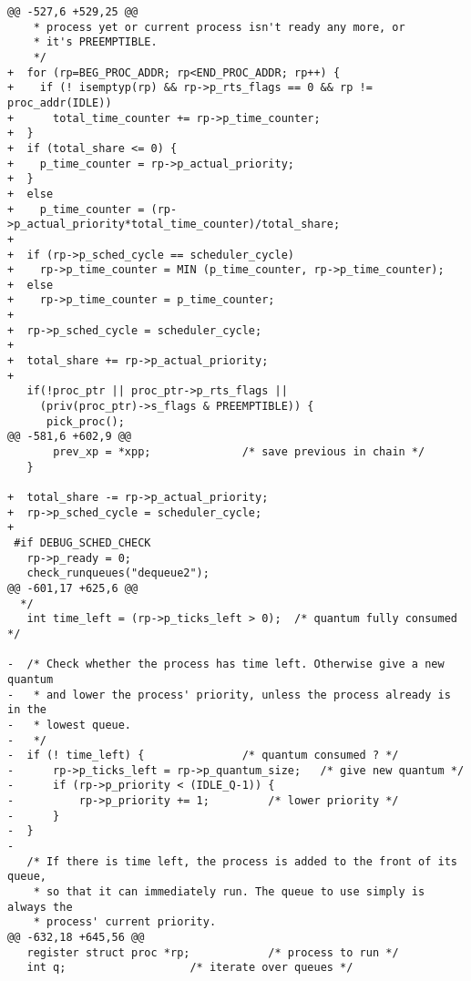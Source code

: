 \begin{verbatim}
@@ -527,6 +529,25 @@
    * process yet or current process isn't ready any more, or
    * it's PREEMPTIBLE.
    */
+  for (rp=BEG_PROC_ADDR; rp<END_PROC_ADDR; rp++) {
+    if (! isemptyp(rp) && rp->p_rts_flags == 0 && rp != proc_addr(IDLE))
+      total_time_counter += rp->p_time_counter;
+  }
+  if (total_share <= 0) {
+    p_time_counter = rp->p_actual_priority;
+  }
+  else
+    p_time_counter = (rp->p_actual_priority*total_time_counter)/total_share; 
+
+  if (rp->p_sched_cycle == scheduler_cycle)
+    rp->p_time_counter = MIN (p_time_counter, rp->p_time_counter);
+  else
+    rp->p_time_counter = p_time_counter;
+
+  rp->p_sched_cycle = scheduler_cycle;
+
+  total_share += rp->p_actual_priority;
+
   if(!proc_ptr || proc_ptr->p_rts_flags ||
     (priv(proc_ptr)->s_flags & PREEMPTIBLE)) {
      pick_proc();
@@ -581,6 +602,9 @@
       prev_xp = *xpp;				/* save previous in chain */
   }
 
+  total_share -= rp->p_actual_priority;
+  rp->p_sched_cycle = scheduler_cycle;
+
 #if DEBUG_SCHED_CHECK
   rp->p_ready = 0;
   check_runqueues("dequeue2");
@@ -601,17 +625,6 @@
  */
   int time_left = (rp->p_ticks_left > 0);	/* quantum fully consumed */
 
-  /* Check whether the process has time left. Otherwise give a new quantum 
-   * and lower the process' priority, unless the process already is in the 
-   * lowest queue.  
-   */
-  if (! time_left) {				/* quantum consumed ? */
-      rp->p_ticks_left = rp->p_quantum_size; 	/* give new quantum */
-      if (rp->p_priority < (IDLE_Q-1)) {  	 
-          rp->p_priority += 1;			/* lower priority */
-      }
-  }
-
   /* If there is time left, the process is added to the front of its queue, 
    * so that it can immediately run. The queue to use simply is always the
    * process' current priority. 
@@ -632,18 +645,56 @@
   register struct proc *rp;			/* process to run */
   int q;					/* iterate over queues */
 

\end{verbatim}
